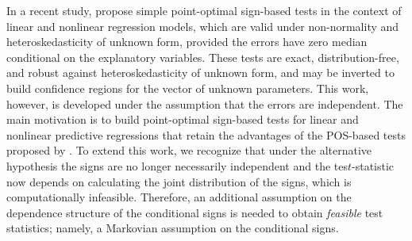 \documentclass[harvard,11pt]{article}
\begin{document}


In a recent study, \citet{dufour2010exact} propose simple
point-optimal sign-based tests in the context of linear and nonlinear regression models,
which are valid under non-normality and hetero\-skedasticity of unknown form,
provided the errors have zero median conditional on the explanatory
variables. These tests are exact, distribution-free, and robust against
hetero\-skedasticity of unknown form, and may be inverted to build confidence
regions for the vector of unknown parameters. This work, however, is
developed under the assumption that the errors are independent. The
main motivation is to build point-optimal sign-based tests for linear and
nonlinear predictive regressions that retain the advantages of the POS-based tests proposed by \citet{dufour2010exact}. To extend this work, we recognize that under the alternative hypothesis the signs are no longer necessarily independent and the tes$t$-statistic now depends on calculating the joint distribution of the signs, which is computationally infeasible. Therefore, an additional
assumption on the dependence structure of the conditional signs is needed to obtain \textit{feasible} test
statistics; namely, a Markovian assumption on the conditional signs. 
\end{document}
